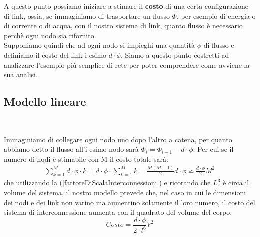 A questo punto possiamo iniziare a stimare il \textbf{costo} di una certa configurazione di link, ossia, se immaginiamo di trasportare un flusso $\Phi$, per esempio di energia o di corrente o di acqua, con il nostro sistema di link, quanto flusso è necessario perchè ogni nodo sia rifornito. \\
Supponiamo quindi che ad ogni nodo si impieghi una quantità $\phi$ di flusso e definiamo il costo del link i-esimo $d\cdot \phi$. Siamo a questo punto costretti ad analizzare l'esempio più semplice di rete per poter comprendere come avviene la sua analisi.

\subsection{Modello lineare}
\begin{center}
	\\
\end{center}



Immaginiamo di collegare ogni nodo uno dopo l'altro a catena, per quanto abbiamo detto il flusso all'i-esimo nodo sarà $\Phi_i=\Phi_{i-1}-d\cdot \phi$. Per cui se il numero di nodi è stimabile con M il costo totale sarà:
\begin{align*}
	\sum^M_{k=1} d\cdot \phi\cdot k = d\cdot \phi\cdot \sum^M_{k=1} k=\frac{M(M-1)}{2}d\cdot \phi\backsimeq\frac{d\cdot\phi}{2}M^2
\end{align*} 
che utilizzando la (\ref{fattoreDiScalaInterconnessioni}) e ricorando che $L^3$ è circa il volume del sistema, il nostro modello prevede che, nel caso in cui le dimensioni dei nodi e dei link non varino ma aumentino solamente il loro numero, il costo del sistema di interconnessione aumenta con il quadrato del volume del corpo.
\begin{equation}
	Costo=\frac{d\cdot\phi}{2\cdot l^6}V^2
\end{equation}

